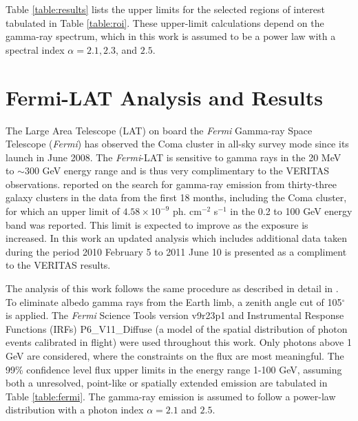 \documentclass[12pt,manuscript]{aastex}
\begin{document}
Table \ref{table:results} lists the upper limits for the selected regions of interest tabulated in Table \ref{table:roi}. These upper-limit calculations depend on the gamma-ray spectrum, which in this work is assumed to be a power law with a spectral index $\alpha=2.1, 2.3$, and $2.5$.

\section{Fermi-LAT Analysis and Results}
The Large Area Telescope (LAT) on board the \emph{Fermi} Gamma-ray Space Telescope (\emph{Fermi}) has observed the Coma cluster in all-sky survey mode since its launch in June 2008. The \emph{Fermi}-LAT is sensitive to gamma rays in the 20 MeV to $\sim$300 GeV energy range and is thus very complimentary to the VERITAS observations. \citet{article:Ackermann_etal:2010} reported on the search for gamma-ray emission from thirty-three galaxy clusters in the data from the first 18 months, including the Coma cluster, for which an upper limit of $4.58\times 10^{-9}$ ph. cm$^{-2}$ s$^{-1}$ in the 0.2 to 100 GeV energy band was reported. This limit is expected to improve as the exposure is increased. In this work an updated analysis which includes additional data taken during the period 2010 February 5 to 2011 June 10 is presented as a compliment to the VERITAS results.

The analysis of this work follows the same procedure as described in detail in \citet{article:Abdo_etal:2009}. To eliminate albedo gamma rays from the Earth limb, a zenith angle cut of 105$^{\circ}$ is applied. The \emph{Fermi} Science Tools version v9r23p1 and Instrumental Response Functions (IRFs) P6\_V11\_Diffuse (a model of the spatial distribution of photon events calibrated  in flight) were used throughout this work. Only photons above 1 GeV are considered, where the constraints on the flux are most meaningful. The 99\% confidence level flux upper limits in the energy range 1-100 GeV, assuming both a unresolved, point-like or spatially extended emission are tabulated in Table \ref{table:fermi}. The gamma-ray emission is assumed to follow a power-law distribution with a photon index $\alpha=2.1$ and $2.5$.
\end{document}
